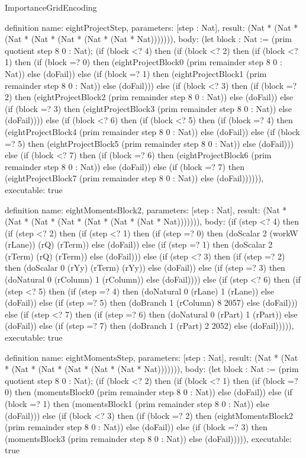 \begin{lexlean}{ImportanceGridEncoding}
\begin{semanticmodule}
definition{
  name: eightProjectStep,
  parameters: [step : Nat],
  result: (Nat * (Nat * (Nat * (Nat * (Nat * (Nat * (Nat * Nat))))))),
  body: (let block : Nat := (prim quotient step 8 0 : Nat); (if (block <? 4) then
      (if (block <? 2) then
      (if (block <? 1) then
      (if (block =? 0) then (eightProjectBlock0 (prim remainder step 8 0 : Nat)) else (doFail)) else
      (if (block =? 1) then (eightProjectBlock1 (prim remainder step 8 0 : Nat)) else (doFail))) else
      (if (block <? 3) then
      (if (block =? 2) then (eightProjectBlock2 (prim remainder step 8 0 : Nat)) else (doFail)) else
      (if (block =? 3) then (eightProjectBlock3 (prim remainder step 8 0 : Nat)) else (doFail)))) else
      (if (block <? 6) then
      (if (block <? 5) then
      (if (block =? 4) then (eightProjectBlock4 (prim remainder step 8 0 : Nat)) else (doFail)) else
      (if (block =? 5) then (eightProjectBlock5 (prim remainder step 8 0 : Nat)) else (doFail))) else
      (if (block <? 7) then
      (if (block =? 6) then (eightProjectBlock6 (prim remainder step 8 0 : Nat)) else (doFail)) else
      (if (block =? 7) then (eightProjectBlock7 (prim remainder step 8 0 : Nat)) else (doFail)))))),
  executable: true
}

definition{
  name: eightMomentsBlock2,
  parameters: [step : Nat],
  result: (Nat * (Nat * (Nat * (Nat * (Nat * (Nat * (Nat * Nat))))))),
  body: (if (step <? 4) then
      (if (step <? 2) then
      (if (step <? 1) then
      (if (step =? 0) then (doScalar 2 (workW (rLane)) (rQ) (rTerm)) else (doFail)) else
      (if (step =? 1) then (doScalar 2 (rTerm) (rQ) (rTerm)) else (doFail))) else
      (if (step <? 3) then
      (if (step =? 2) then (doScalar 0 (rYy) (rTerm) (rYy)) else (doFail)) else
      (if (step =? 3) then (doNatural 0 (rColumn) 1 (rColumn)) else (doFail)))) else
      (if (step <? 6) then
      (if (step <? 5) then
      (if (step =? 4) then (doNatural 0 (rLane) 1 (rLane)) else (doFail)) else
      (if (step =? 5) then (doBranch 1 (rColumn) 8 2057) else (doFail))) else
      (if (step <? 7) then
      (if (step =? 6) then (doNatural 0 (rPart) 1 (rPart)) else (doFail)) else
      (if (step =? 7) then (doBranch 1 (rPart) 2 2052) else (doFail))))),
  executable: true
}

definition{
  name: eightMomentsStep,
  parameters: [step : Nat],
  result: (Nat * (Nat * (Nat * (Nat * (Nat * (Nat * (Nat * Nat))))))),
  body: (let block : Nat := (prim quotient step 8 0 : Nat); (if (block <? 2) then
      (if (block <? 1) then
      (if (block =? 0) then (momentsBlock0 (prim remainder step 8 0 : Nat)) else (doFail)) else
      (if (block =? 1) then (momentsBlock1 (prim remainder step 8 0 : Nat)) else (doFail))) else
      (if (block <? 3) then
      (if (block =? 2) then (eightMomentsBlock2 (prim remainder step 8 0 : Nat)) else (doFail)) else
      (if (block =? 3) then (momentsBlock3 (prim remainder step 8 0 : Nat)) else (doFail))))),
  executable: true
}


\end{semanticmodule}
\end{lexlean}
